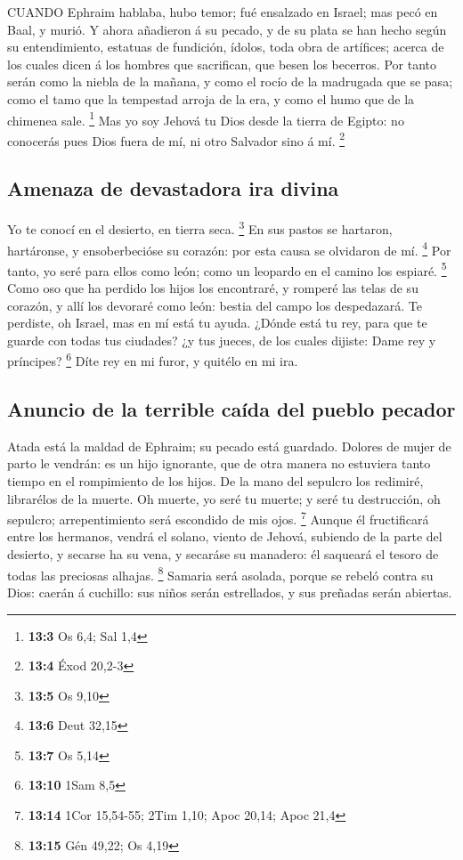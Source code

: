  CUANDO Ephraim hablaba, hubo temor; fué ensalzado en
Israel; mas pecó en Baal, y murió.  Y ahora añadieron á su
pecado, y de su plata se han hecho según su entendimiento, estatuas de
fundición, ídolos, toda obra de artífices; acerca de los cuales dicen á
los hombres que sacrifican, que besen los becerros.  Por
tanto serán como la niebla de la mañana, y como el rocío de la madrugada
que se pasa; como el tamo que la tempestad arroja de la era, y como el
humo que de la chimenea sale. \footnote{\textbf{13:3} Os 6,4; Sal 1,4}
 Mas yo soy Jehová tu Dios desde la tierra de Egipto: no
conocerás pues Dios fuera de mí, ni otro Salvador sino á mí. \footnote{\textbf{13:4}
  Éxod 20,2-3}

\hypertarget{amenaza-de-devastadora-ira-divina}{%
\subsection{Amenaza de devastadora ira
divina}\label{amenaza-de-devastadora-ira-divina}}

 Yo te conocí en el desierto, en tierra seca. \footnote{\textbf{13:5}
  Os 9,10}  En sus pastos se hartaron, hartáronse, y
ensoberbecióse su corazón: por esta causa se olvidaron de mí.
\footnote{\textbf{13:6} Deut 32,15}  Por tanto, yo seré para
ellos como león; como un leopardo en el camino los espiaré. \footnote{\textbf{13:7}
  Os 5,14}  Como oso que ha perdido los hijos los
encontraré, y romperé las telas de su corazón, y allí los devoraré como
león: bestia del campo los despedazará.  Te perdiste, oh
Israel, mas en mí está tu ayuda.  ¿Dónde está tu rey, para
que te guarde con todas tus ciudades? ¿y tus jueces, de los cuales
dijiste: Dame rey y príncipes? \footnote{\textbf{13:10} 1Sam 8,5}
 Díte rey en mi furor, y quitélo en mi ira.

\hypertarget{anuncio-de-la-terrible-cauxedda-del-pueblo-pecador}{%
\subsection{Anuncio de la terrible caída del pueblo
pecador}\label{anuncio-de-la-terrible-cauxedda-del-pueblo-pecador}}

 Atada está la maldad de Ephraim; su pecado está guardado.
 Dolores de mujer de parto le vendrán: es un hijo
ignorante, que de otra manera no estuviera tanto tiempo en el
rompimiento de los hijos.  De la mano del sepulcro los
redimiré, librarélos de la muerte. Oh muerte, yo seré tu muerte; y seré
tu destrucción, oh sepulcro; arrepentimiento será escondido de mis ojos.
\footnote{\textbf{13:14} 1Cor 15,54-55; 2Tim 1,10; Apoc 20,14; Apoc 21,4}
 Aunque él fructificará entre los hermanos, vendrá el
solano, viento de Jehová, subiendo de la parte del desierto, y secarse
ha su vena, y secaráse su manadero: él saqueará el tesoro de todas las
preciosas alhajas. \footnote{\textbf{13:15} Gén 49,22; Os 4,19}
 Samaria será asolada, porque se rebeló contra su Dios:
caerán á cuchillo: sus niños serán estrellados, y sus preñadas serán
abiertas.


